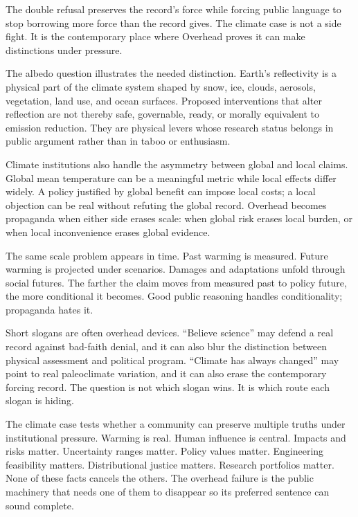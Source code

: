 The double refusal preserves the record's force while forcing public
language to stop borrowing more force than the record gives. The
climate case is not a side fight. It is the contemporary place where
Overhead proves it can make distinctions under pressure.

The albedo question illustrates the needed distinction. Earth's
reflectivity is a physical part of the climate system shaped by snow,
ice, clouds, aerosols, vegetation, land use, and ocean surfaces.
Proposed interventions that alter reflection are not thereby safe,
governable, ready, or morally equivalent to emission reduction. They
are physical levers whose research status belongs in public argument
rather than in taboo or enthusiasm.

Climate institutions also handle the asymmetry between global and
local claims. Global mean temperature can be a meaningful metric while
local effects differ widely. A policy justified by global benefit can
impose local costs; a local objection can be real without refuting the
global record. Overhead becomes propaganda when either side erases
scale: when global risk erases local burden, or when local
inconvenience erases global evidence.

The same scale problem appears in time. Past warming is measured.
Future warming is projected under scenarios. Damages and adaptations
unfold through social futures. The farther the claim moves from
measured past to policy future, the more conditional it becomes. Good
public reasoning handles conditionality; propaganda hates it.

Short slogans are often overhead devices. ``Believe science'' may
defend a real record against bad-faith denial, and it can also blur
the distinction between physical assessment and political program.
``Climate has always changed'' may point to real paleoclimate
variation, and it can also erase the contemporary forcing record. The
question is not which slogan wins. It is which route each slogan is
hiding.

The climate case tests whether a community can preserve multiple truths
under institutional pressure. Warming is real. Human influence is
central. Impacts and risks matter. Uncertainty ranges matter. Policy
values matter. Engineering feasibility matters. Distributional justice
matters. Research portfolios matter. None of these facts cancels the
others. The overhead failure is the public machinery that needs one of
them to disappear so its preferred sentence can sound complete.

